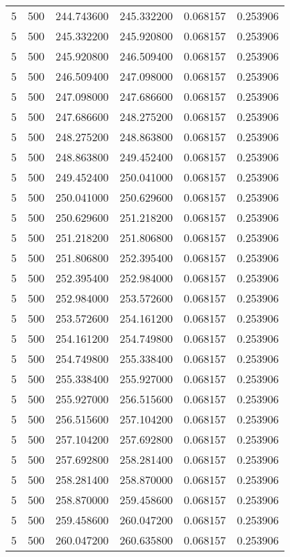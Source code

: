 \begin{longtable}{rrrrrr}
5 & 500 & 244.743600 & 245.332200 & 0.068157 & 0.253906 \\
5 & 500 & 245.332200 & 245.920800 & 0.068157 & 0.253906 \\
5 & 500 & 245.920800 & 246.509400 & 0.068157 & 0.253906 \\
5 & 500 & 246.509400 & 247.098000 & 0.068157 & 0.253906 \\
5 & 500 & 247.098000 & 247.686600 & 0.068157 & 0.253906 \\
5 & 500 & 247.686600 & 248.275200 & 0.068157 & 0.253906 \\
5 & 500 & 248.275200 & 248.863800 & 0.068157 & 0.253906 \\
5 & 500 & 248.863800 & 249.452400 & 0.068157 & 0.253906 \\
5 & 500 & 249.452400 & 250.041000 & 0.068157 & 0.253906 \\
5 & 500 & 250.041000 & 250.629600 & 0.068157 & 0.253906 \\
5 & 500 & 250.629600 & 251.218200 & 0.068157 & 0.253906 \\
5 & 500 & 251.218200 & 251.806800 & 0.068157 & 0.253906 \\
5 & 500 & 251.806800 & 252.395400 & 0.068157 & 0.253906 \\
5 & 500 & 252.395400 & 252.984000 & 0.068157 & 0.253906 \\
5 & 500 & 252.984000 & 253.572600 & 0.068157 & 0.253906 \\
5 & 500 & 253.572600 & 254.161200 & 0.068157 & 0.253906 \\
5 & 500 & 254.161200 & 254.749800 & 0.068157 & 0.253906 \\
5 & 500 & 254.749800 & 255.338400 & 0.068157 & 0.253906 \\
5 & 500 & 255.338400 & 255.927000 & 0.068157 & 0.253906 \\
5 & 500 & 255.927000 & 256.515600 & 0.068157 & 0.253906 \\
5 & 500 & 256.515600 & 257.104200 & 0.068157 & 0.253906 \\
5 & 500 & 257.104200 & 257.692800 & 0.068157 & 0.253906 \\
5 & 500 & 257.692800 & 258.281400 & 0.068157 & 0.253906 \\
5 & 500 & 258.281400 & 258.870000 & 0.068157 & 0.253906 \\
5 & 500 & 258.870000 & 259.458600 & 0.068157 & 0.253906 \\
5 & 500 & 259.458600 & 260.047200 & 0.068157 & 0.253906 \\
5 & 500 & 260.047200 & 260.635800 & 0.068157 & 0.253906 \\

\end{longtable}
